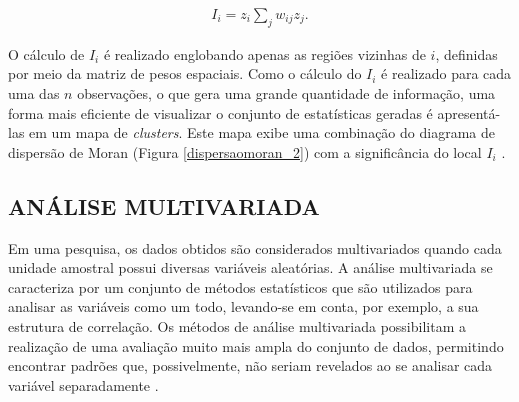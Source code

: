 \documentclass[12pt,a4paper]{article}
\begin{document}
\begin{align*}
	I_i = z_i \sum_{j}^{} w_{ij} z_j.
\end{align*}

O cálculo de $I_i$ é realizado englobando apenas as regiões vizinhas de $i$, definidas por meio da matriz de pesos espaciais. Como o cálculo do $I_i$ é realizado para cada uma das $n$ observações, o que gera uma grande quantidade de informação, uma forma mais eficiente de visualizar o conjunto de estatísticas geradas é apresentá-las em um mapa de \textit{clusters}. Este mapa exibe uma combinação do diagrama de dispersão de Moran (Figura \ref{dispersaomoran_2}) com a significância do local $I_i$ \cite{almeida12_g}. 

	
	
	


\subsection{ANÁLISE MULTIVARIADA}
	
Em uma pesquisa, os dados obtidos são considerados multivariados quando cada unidade amostral possui diversas variáveis aleatórias. A análise multivariada se caracteriza por um conjunto de métodos estatísticos que são utilizados para analisar as variáveis como um todo, levando-se em conta, por exemplo, a sua estrutura de correlação. Os métodos de análise multivariada possibilitam a realização de  uma avaliação muito mais ampla do conjunto de dados, permitindo encontrar padrões que, possivelmente, não seriam revelados ao se analisar cada variável separadamente \cite{mingoti10}. 
	
\end{document}
